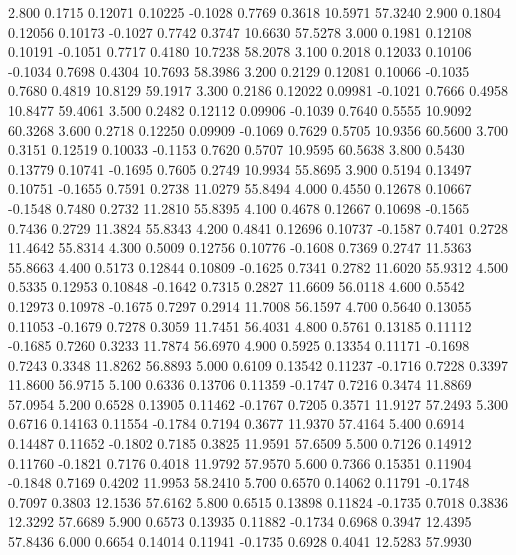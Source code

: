    2.800   0.1715   0.12071   0.10225  -0.1028   0.7769   0.3618  10.5971  57.3240
   2.900   0.1804   0.12056   0.10173  -0.1027   0.7742   0.3747  10.6630  57.5278
   3.000   0.1981   0.12108   0.10191  -0.1051   0.7717   0.4180  10.7238  58.2078
   3.100   0.2018   0.12033   0.10106  -0.1034   0.7698   0.4304  10.7693  58.3986
   3.200   0.2129   0.12081   0.10066  -0.1035   0.7680   0.4819  10.8129  59.1917
   3.300   0.2186   0.12022   0.09981  -0.1021   0.7666   0.4958  10.8477  59.4061
   3.500   0.2482   0.12112   0.09906  -0.1039   0.7640   0.5555  10.9092  60.3268
   3.600   0.2718   0.12250   0.09909  -0.1069   0.7629   0.5705  10.9356  60.5600
   3.700   0.3151   0.12519   0.10033  -0.1153   0.7620   0.5707  10.9595  60.5638
   3.800   0.5430   0.13779   0.10741  -0.1695   0.7605   0.2749  10.9934  55.8695
   3.900   0.5194   0.13497   0.10751  -0.1655   0.7591   0.2738  11.0279  55.8494
   4.000   0.4550   0.12678   0.10667  -0.1548   0.7480   0.2732  11.2810  55.8395
   4.100   0.4678   0.12667   0.10698  -0.1565   0.7436   0.2729  11.3824  55.8343
   4.200   0.4841   0.12696   0.10737  -0.1587   0.7401   0.2728  11.4642  55.8314
   4.300   0.5009   0.12756   0.10776  -0.1608   0.7369   0.2747  11.5363  55.8663
   4.400   0.5173   0.12844   0.10809  -0.1625   0.7341   0.2782  11.6020  55.9312
   4.500   0.5335   0.12953   0.10848  -0.1642   0.7315   0.2827  11.6609  56.0118
   4.600   0.5542   0.12973   0.10978  -0.1675   0.7297   0.2914  11.7008  56.1597
   4.700   0.5640   0.13055   0.11053  -0.1679   0.7278   0.3059  11.7451  56.4031
   4.800   0.5761   0.13185   0.11112  -0.1685   0.7260   0.3233  11.7874  56.6970
   4.900   0.5925   0.13354   0.11171  -0.1698   0.7243   0.3348  11.8262  56.8893
   5.000   0.6109   0.13542   0.11237  -0.1716   0.7228   0.3397  11.8600  56.9715
   5.100   0.6336   0.13706   0.11359  -0.1747   0.7216   0.3474  11.8869  57.0954
   5.200   0.6528   0.13905   0.11462  -0.1767   0.7205   0.3571  11.9127  57.2493
   5.300   0.6716   0.14163   0.11554  -0.1784   0.7194   0.3677  11.9370  57.4164
   5.400   0.6914   0.14487   0.11652  -0.1802   0.7185   0.3825  11.9591  57.6509
   5.500   0.7126   0.14912   0.11760  -0.1821   0.7176   0.4018  11.9792  57.9570
   5.600   0.7366   0.15351   0.11904  -0.1848   0.7169   0.4202  11.9953  58.2410
   5.700   0.6570   0.14062   0.11791  -0.1748   0.7097   0.3803  12.1536  57.6162
   5.800   0.6515   0.13898   0.11824  -0.1735   0.7018   0.3836  12.3292  57.6689
   5.900   0.6573   0.13935   0.11882  -0.1734   0.6968   0.3947  12.4395  57.8436
   6.000   0.6654   0.14014   0.11941  -0.1735   0.6928   0.4041  12.5283  57.9930
